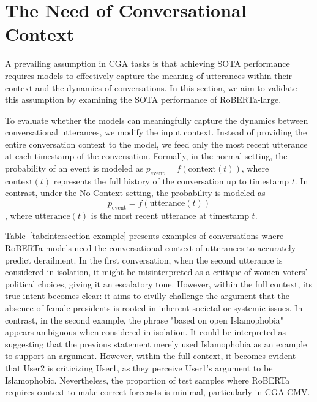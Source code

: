 \section{The Need of Conversational Context}

A prevailing assumption in CGA tasks is that achieving SOTA performance requires models to effectively capture the meaning of utterances within their context and the dynamics of conversations. In this section, we aim to validate this assumption by examining the SOTA performance of RoBERTa-large.


To evaluate whether the models can meaningfully capture the dynamics between conversational utterances, we modify the input context. 
%
Instead of providing the entire conversation context to the model, we feed only the most recent utterance at each timestamp of the conversation. 
%
Formally, in the normal setting, the probability of an event is modeled as $p_{\text{event}} = f(\text{context}(t))$, where $\text{context}(t)$ represents the full history of the conversation up to timestamp $t$. 
%
In contrast, under the No-Context setting, the probability is modeled as $$p_{\text{event}} = f(\text{utterance}(t))$$, where $\text{utterance}(t)$ is the most recent utterance at timestamp $t$. 



Table~\ref{tab:intersection-example} presents examples of conversations where RoBERTa models need the conversational context of utterances to accurately predict derailment. 
%
In the first conversation, when the second utterance is considered in isolation, it might be misinterpreted as a critique of women voters' political choices, giving it an escalatory tone. 
%
However, within the full context, its true intent becomes clear: it aims to civilly challenge the argument that the absence of female presidents is rooted in inherent societal or systemic issues.
%
In contrast, in the second example, the phrase "based on open Islamophobia" appears ambiguous when considered in isolation. 
%
It could be interpreted as suggesting that the previous statement merely used Islamophobia as an example to support an argument.
%
However, within the full context, it becomes evident that User2 is criticizing User1, as they perceive User1's argument to be Islamophobic. 
%
Nevertheless, the proportion of test samples where RoBERTa requires context to make correct forecasts is minimal, particularly in CGA-CMV.

